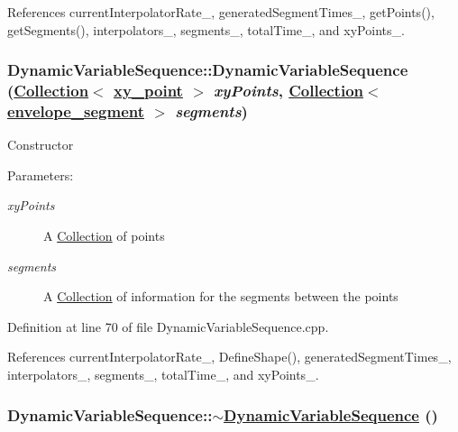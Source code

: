 References current\-Interpolator\-Rate\_\-, generated\-Segment\-Times\_\-, get\-Points(), get\-Segments(), interpolators\_\-, segments\_\-, total\-Time\_\-, and xy\-Points\_\-.\hypertarget{classDynamicVariableSequence_a2}{
\subsubsection[DynamicVariableSequence]{\setlength{\rightskip}{0pt plus 5cm}Dynamic\-Variable\-Sequence::Dynamic\-Variable\-Sequence (\hyperlink{classCollection}{Collection}$<$ \hyperlink{structxy__point}{xy\_\-point} $>$ {\em xy\-Points}, \hyperlink{classCollection}{Collection}$<$ \hyperlink{structenvelope__segment}{envelope\_\-segment} $>$ {\em segments})}}
\label{classDynamicVariableSequence_a2}


Constructor \begin{Desc}
\item[Parameters:]
\begin{description}
\item[{\em xy\-Points}]A \hyperlink{classCollection}{Collection} of points \item[{\em segments}]A \hyperlink{classCollection}{Collection} of information for the segments between the points \end{description}
\end{Desc}


Definition at line 70 of file Dynamic\-Variable\-Sequence.cpp.

References current\-Interpolator\-Rate\_\-, Define\-Shape(), generated\-Segment\-Times\_\-, interpolators\_\-, segments\_\-, total\-Time\_\-, and xy\-Points\_\-.\hypertarget{classDynamicVariableSequence_a3}{
\subsubsection[$\sim$DynamicVariableSequence]{\setlength{\rightskip}{0pt plus 5cm}Dynamic\-Variable\-Sequence::$\sim$\hyperlink{classDynamicVariableSequence}{Dynamic\-Variable\-Sequence} ()}}
\label{classDynamicVariableSequence_a3}


